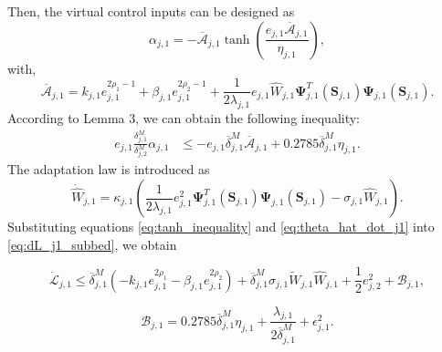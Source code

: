 Then, the virtual control inputs can be designed as
\begin{equation} \label{eq:alpha_j1}
\alpha_{j,1} = -\overline{\mathcal{A}}_{j,1}\tanh \left (\frac{e_{j,1}\overline{\mathcal{A}}_{j,1}}{\eta_{j,1}}\right ),
\end{equation}
with,
\begin{equation} \label{eq:A_bar_j1}
\overline{\mathcal{A}}_{j,1} = k_{j,1}e_{j,1}^{2\rho_1 - 1} + \beta_{j,1}e_{j,1}^{2\rho_2 - 1} + \frac{1}{2\lambda_{j,1}}e_{j,1}\hat{W}_{j,1}\mathbf{\Psi}_{j,1}^T(\mathbf{S}_{j,1})\mathbf{\Psi}_{j,1}(\mathbf{S}_{j,1}).
\end{equation}
According to Lemma 3, we can obtain the following inequality:
\begin{equation}\label{eq:tanh_inequality}
\begin{aligned}
e_{j,1}\frac{\delta_{j,1}^M}{\delta_{j,2}^M}\alpha_{j,1} &\leq -e_{j,1}\overline{\delta}_{j,1}^M\overline{\mathcal{A}}_{j,1} + 0.2785\overline{\delta}_{j,1}^M\eta_{j,1}.
\end{aligned}
\end{equation}
The adaptation law is introduced as
\begin{equation}\label{eq:theta_hat_dot_j1}
\dot{\widehat{W}}_{j,1} = \kappa_{j,1}(\frac{1}{2\lambda_{j,1}}e_{j,1}^2\mathbf{\Psi}_{j,1}^T(\mathbf{S}_{j,1})\mathbf{\Psi}_{j,1}(\mathbf{S}_{j,1}) - \sigma_{j,1}\hat{W}_{j,1}).
\end{equation}
Substituting equations \eqref{eq:tanh_inequality} and \eqref{eq:theta_hat_dot_j1} into \eqref{eq:dL_j1_subbed}, we obtain

\begin{equation}\label{eq:dL_j1_final}
\dot{\mathcal{L}}_{j,1} \leq \overline{\delta}_{j,1}^M(-k_{j,1}e_{j,1}^{2\rho_{1}} - \beta_{j,1}e_{j,1}^{2\rho_{2}}) + \overline{\delta}_{j,1}^M\sigma_{j,1}\tilde{W}_{j,1}\hat{W}_{j,1} + \frac{1}{2}e_{j,2}^{2} + \mathcal{B}_{j,1},
\end{equation}

\begin{equation} \label{eq:h_j1}
\mathcal{B}_{j,1} = 0.2785\overline{\delta}_{j,1}^M\eta_{j,1} + \frac{\lambda_{j,1}}{2\overline{\delta}_{j,1}^M} + \epsilon_{j,1}^{2}.
\end{equation}

